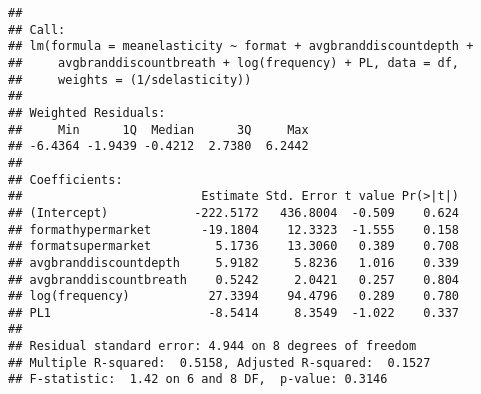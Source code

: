 \documentclass[
]{article}
\begin{document}
\begin{verbatim}
## 
## Call:
## lm(formula = meanelasticity ~ format + avgbranddiscountdepth + 
##     avgbranddiscountbreath + log(frequency) + PL, data = df, 
##     weights = (1/sdelasticity))
## 
## Weighted Residuals:
##     Min      1Q  Median      3Q     Max 
## -6.4364 -1.9439 -0.4212  2.7380  6.2442 
## 
## Coefficients:
##                         Estimate Std. Error t value Pr(>|t|)
## (Intercept)            -222.5172   436.8004  -0.509    0.624
## formathypermarket       -19.1804    12.3323  -1.555    0.158
## formatsupermarket         5.1736    13.3060   0.389    0.708
## avgbranddiscountdepth     5.9182     5.8236   1.016    0.339
## avgbranddiscountbreath    0.5242     2.0421   0.257    0.804
## log(frequency)           27.3394    94.4796   0.289    0.780
## PL1                      -8.5414     8.3549  -1.022    0.337
## 
## Residual standard error: 4.944 on 8 degrees of freedom
## Multiple R-squared:  0.5158, Adjusted R-squared:  0.1527 
## F-statistic:  1.42 on 6 and 8 DF,  p-value: 0.3146
\end{verbatim}
\end{document}
